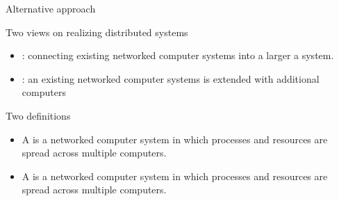 \begin{slide}{Alternative approach}
  \begin{block}{Two views on realizing distributed systems}
    \begin{itemize}
    \item {}: connecting existing networked computer systems into a larger a system.
    \item {}: an existing networked computer systems is extended with additional
      computers 
    \end{itemize}
  \end{block}
  \onslide
  \begin{block}{Two definitions}
    \begin{itemize}
    \item A  is a networked computer system in which processes and resources are
       spread across multiple computers.
    \item A  is a networked computer system in which processes and resources are
       spread across multiple computers.
    \end{itemize}
  \end{block}
\end{slide}
